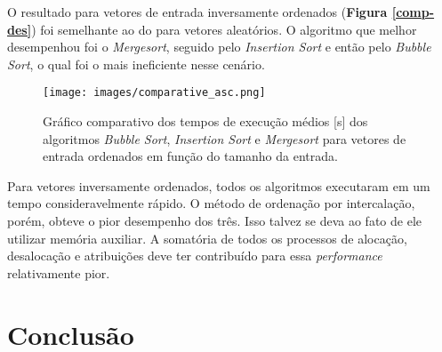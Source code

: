 \documentclass[fontsize=10pt]{article}
\begin{document}
O resultado para vetores de entrada inversamente ordenados (\textbf{Figura \ref{comp-des}}) foi semelhante ao do para vetores aleatórios. O algoritmo que melhor desempenhou foi o \textit{Mergesort}, seguido pelo \textit{Insertion Sort} e então pelo \textit{Bubble Sort}, o qual foi o mais ineficiente nesse cenário.


\begin{figure}[H]
\centering
\texttt{[image: images/comparative\_asc.png]}
\caption{Gráfico comparativo dos tempos de execução médios [s] dos algoritmos \textit{Bubble Sort}, \textit{Insertion Sort} e \textit{Mergesort} para vetores de entrada ordenados em função do tamanho da entrada.}
\label{comp-asc}
\end{figure}


Para vetores inversamente ordenados, todos os algoritmos executaram em um tempo consideravelmente rápido. O método de ordenação por intercalação, porém, obteve o pior desempenho dos três. Isso talvez se deva ao fato de ele utilizar memória auxiliar. A somatória de todos os processos de alocação, desalocação e atribuições deve ter contribuído para essa \textit{performance} relativamente pior.

    
\section{Conclusão}




\end{document}
